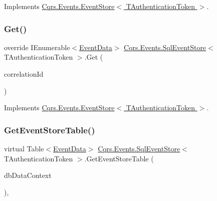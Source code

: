 Implements \hyperlink{classCqrs_1_1Events_1_1EventStore_aa1d0d399a35c1e3b0759e27202695d8b_aa1d0d399a35c1e3b0759e27202695d8b}{Cqrs.\+Events.\+Event\+Store$<$ T\+Authentication\+Token $>$}.

\mbox{\label{classCqrs_1_1Events_1_1SqlEventStore_ac1fb2bdec07cbeec57fb3d985e7a8b31_ac1fb2bdec07cbeec57fb3d985e7a8b31}} 
\subsubsection{\texorpdfstring{Get()}{Get()}\hspace{0.1cm}{\footnotesize\ttfamily [2/2]}}
{\footnotesize\ttfamily override I\+Enumerable$<$\hyperlink{classCqrs_1_1Events_1_1EventData}{Event\+Data}$>$ \hyperlink{classCqrs_1_1Events_1_1SqlEventStore}{Cqrs.\+Events.\+Sql\+Event\+Store}$<$ T\+Authentication\+Token $>$.Get (\begin{DoxyParamCaption}\item[{Guid}]{correlation\+Id }\end{DoxyParamCaption})\hspace{0.3cm}{\ttfamily [virtual]}}



Implements \hyperlink{classCqrs_1_1Events_1_1EventStore_a0096646f5dff730b0041b9469719c420_a0096646f5dff730b0041b9469719c420}{Cqrs.\+Events.\+Event\+Store$<$ T\+Authentication\+Token $>$}.

\mbox{\label{classCqrs_1_1Events_1_1SqlEventStore_a6daa6c32874ab593d0d8a54c90d219c6_a6daa6c32874ab593d0d8a54c90d219c6}} 
\subsubsection{\texorpdfstring{Get\+Event\+Store\+Table()}{GetEventStoreTable()}}
{\footnotesize\ttfamily virtual Table$<$\hyperlink{classCqrs_1_1Events_1_1EventData}{Event\+Data}$>$ \hyperlink{classCqrs_1_1Events_1_1SqlEventStore}{Cqrs.\+Events.\+Sql\+Event\+Store}$<$ T\+Authentication\+Token $>$.Get\+Event\+Store\+Table (\begin{DoxyParamCaption}\item[{Data\+Context}]{db\+Data\+Context }\end{DoxyParamCaption})\hspace{0.3cm}{\ttfamily [protected]}, {\ttfamily [virtual]}}

